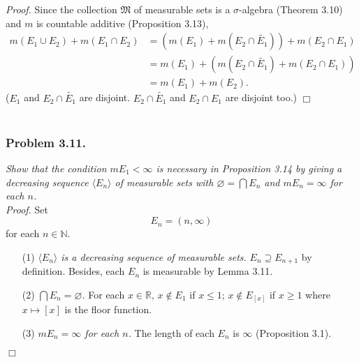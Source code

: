 \documentclass{article}
\begin{document}
\emph{Proof.}
Since the collection $\mathfrak{M}$ of measurable sets is a $\sigma$-algebra
(Theorem 3.10) and $m$ is countable additive (Proposition 3.13),
\begin{align*}
  m(E_1 \cup E_2) + m(E_1 \cap E_2)
  & = \left( m(E_1) + m(E_2 \cap \widetilde{E_1}) \right) + m(E_2 \cap E_1) \\
  & = m(E_1) + \left( m(E_2 \cap \widetilde{E_1}) + m(E_2 \cap E_1) \right) \\
  & = m(E_1) + m(E_2).
\end{align*}
($E_1$ and $E_2 \cap \widetilde{E_1}$ are disjoint.
$E_2 \cap \widetilde{E_1}$ and $E_2 \cap E_1$ are disjoint too.)
$\Box$ \\\\






\subsubsection*{Problem 3.11.}
\emph{Show that the condition $mE_1 < \infty$ is necessary in Proposition 3.14 by
giving a decreasing sequence $\langle E_n \rangle$ of measurable sets with
$\varnothing = \bigcap E_n$ and $mE_n = \infty$ for each $n$.} \\



\emph{Proof.}
Set $$E_n = (n, \infty)$$ for each $n \in \mathbb{N}$.
\begin{enumerate}
\item[(1)]
  \emph{$\langle E_n \rangle$ is a decreasing sequence of measurable sets.}
  $E_n \supseteq E_{n+1}$ by definition.
  Besides, each $E_n$ is measurable by Lemma 3.11.

\item[(2)]
  \emph{$\bigcap E_n = \varnothing$.}
  For each $x \in \mathbb{R}$, $x \notin E_1$ if $x \leq 1$;
  $x \notin E_{[x]}$ if $x \geq 1$ where $x \mapsto [x]$ is the floor function.

\item[(3)]
  \emph{$mE_n = \infty$ for each $n$.}
  The length of each $E_n$ is $\infty$ (Proposition 3.1).
\end{enumerate}
$\Box$ \\\\
\end{document}
